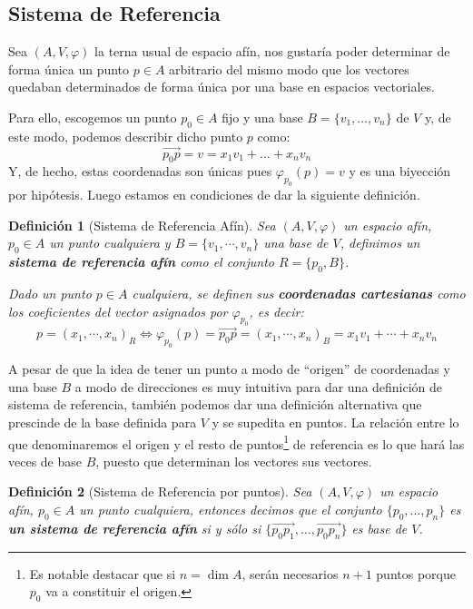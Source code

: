 \documentclass[10pt,a4paper,openright]{book}
\theoremstyle{break}
\newtheorem*{defi}{Definición}
\begin{document}
\subsection{Sistema de Referencia}
Sea $(A, V, \varphi)$ la terna usual de espacio afín, nos gustaría poder determinar de forma única un punto $p \in A$ arbitrario del mismo modo que los vectores quedaban determinados de forma única por una base en espacios vectoriales.

Para ello, escogemos un punto $p_0 \in A $ fijo y una base $B=\{v_1, \ldots, v_n\}$ de $V$ y, de este modo, podemos describir dicho punto $p$ como:
$$\vec{p_0p} = v= x_1 v_1 + \ldots + x_n v_n$$
Y, de hecho, estas coordenadas son únicas pues $\varphi_{p_0}(p) = v$ y es una biyección por hipótesis. Luego estamos en condiciones de dar la siguiente definición.

\begin{defi}[Sistema de Referencia Afín]
Sea $(A,V,\varphi)$ un espacio afín, $p_0\in A$ un punto cualquiera y $B=\{v_1,\cdots, v_n\}$ una base de $V$, definimos un \textbf{sistema de referencia afín} como el conjunto $R=\{p_0, B\}$.

Dado un punto $p\in A$ cualquiera, se definen sus \textbf{coordenadas cartesianas} como los coeficientes del vector asignados por $\varphi_{p_0}$, es decir:
$$p=(x_1, \cdots, x_n)_{R} \Leftrightarrow \varphi_{p_0}(p) = \vec{p_0p}=(x_1, \cdots, x_n)_B=  x_1v_1 + \cdots + x_nv_n$$ 
\end{defi}

A pesar de que la idea de tener un punto a modo de ``origen'' de coordenadas y una base $B$ a modo de direcciones es muy intuitiva para dar una definición de sistema de referencia, también podemos dar una definición alternativa que prescinde de la base definida para $V$ y se  supedita en puntos. La relación entre lo que denominaremos el origen y el resto de puntos\footnote{Es notable destacar que si $n= \dim A$, serán necesarios $n+1$ puntos porque $p_0$ va a constituir el origen.} de referencia es lo que hará las veces de base $B$, puesto que determinan los vectores sus vectores.

\begin{defi}[Sistema de Referencia por puntos]
Sea $(A,V,\varphi)$ un espacio afín, $p_0\in A$ un punto cualquiera, entonces decimos que el conjunto $\{p_0, \ldots, p_n\}$ es \textbf{un sistema de referencia afín } si y sólo si $\{\vec{p_0 p_1}, \ldots, \vec{p_0 p_n}\}$ es base de $V$.
\end{defi}
\end{document}
